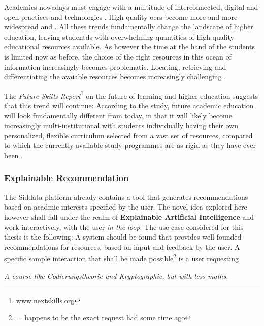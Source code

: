 Academics nowadays must engage with a multitude of interconnected, digital and open practices and technologies \cite{Atenas2014}. High-quality \glspl{oer} become more and more widespread and  \cite[2]{Olcott2012}. All these trends fundamentally change the landscape of higher education, leaving studentds with overwhelming quantities of high-quality educational resources available. As however the time at the hand of the students is limited now as before, the choice of the right resources in this ocean of information increasingly becomes problematic. Locating, retrieving and differentiating the avaiable resources becomes increasingly challenging \cite{Atenas2014}.

The \emph{Future Skills Report}\footnote{\url{www.nextskills.org}} on the future of learning and higher education \cite{Ehlers2019} suggests that this trend will continue: According to the study, future academic education will look fundamentally different from today, in that it will likely become increasingly multi-institutional with students individually having their own personalized, flexible curriculum selected from a vast set of resources, compared to which the currently available study programmes are as rigid as they have ever been \cite{Ehlers2019}.

\subsubsection*{Explainable Recommendation}

The Siddata-platform already contains a tool that generates recommendations based on acadmic interests specified by the user. The novel idea explored here however shall fall under the realm of \textbf{Explainable Artificial Intelligence} and work interactively, with the user \textit{in the loop}. The use case considered for this thesis is the following: A system should be found that provides well-founded recommendations for resources, based on input and feedback by the user. A specific sample interaction that shall be made possible\footnote{... happens to be the exact request \me had some time ago} is a user requesting 
\begin{displayquote}
	\textit{\guillemotright A course like \emph{Codierungstheorie und Kryptographie}, but with less maths.\guillemotleft}
\end{displayquote}

